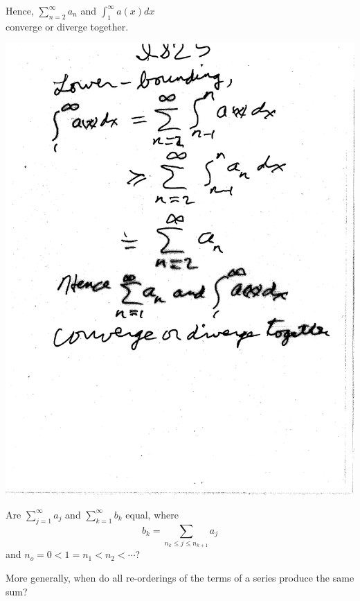 \documentclass[10pt,a4paper]{article}
\begin{document}
{{\noindent Hence, $\sum_{n=2}^{\infty} a_n $ and $ \int_{1}^{\infty} a(x) dx$
\\ converge or diverge together.

\includegraphics[scale=.5]{Pages/IS_25}

\newpage

\noindent Are $\sum_{j=1}^{\infty} a_j$ and $ \sum_{k=1}^{\infty} b_k$ equal, where 
\\$$b_k = \sum_{n_k \leq j \leq n_{k+1}} a_j$$
and $n_o = 0 < 1 = n_1 < n_2 < \cdots $? 
\\ \vspace{2mm}

\noindent More generally, when do all re-orderings of the terms of a series produce the same sum?

}}
\end{document}
